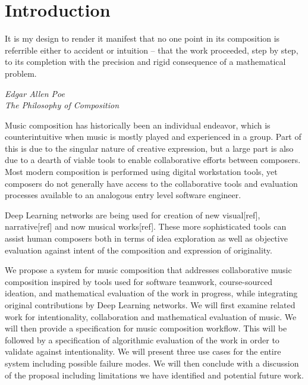 \documentclass[final,authoryear,5p,times,twocolumn]{elsarticle}
\begin{document}
\section{Introduction}
\label{sec:introduction}


\epigraph{It is my design to render it manifest that no one point in its composition is referrible either to accident or intuition -- that the work proceeded, step by step, to its completion with the precision and rigid consequence of a mathematical problem.}{\textit{Edgar Allen Poe \\ The Philosophy of Composition}}

Music composition has historically been an individual endeavor, which is counterintuitive when music is
mostly played and experienced in a group. Part of this is due to the singular nature of creative 
expression, but a large part is also due to a dearth of viable tools to enable collaborative efforts
between composers. Most modern composition is performed using digital workstation tools, yet composers do not generally
have access to the collaborative tools and evaluation processes available to an analogous entry level software engineer.

Deep Learning networks are being used for creation of new visual[ref], narrative[ref] and now musical works[ref].
These more sophisticated tools can assist human composers both in terms of idea exploration as well as 
objective evaluation against intent of the composition and expression of originality.

We propose a system for music composition that addresses collaborative music composition inspired by
tools used for software teamwork, course-sourced ideation, and mathematical evaluation of the work in progress,
while integrating original contributions by Deep Learning networks.
We will first examine related work for intentionality, collaboration and mathematical evaluation of music.  We will
then provide a specification for music composition workflow. This will be
followed by a specification of algorithmic evaluation of the work in order to validate against intentionality.
We will present three use cases for the entire system including possible failure modes. We will then 
conclude with a discussion of the proposal including limitations we have identified and potential future work.


%
%
\end{document}
